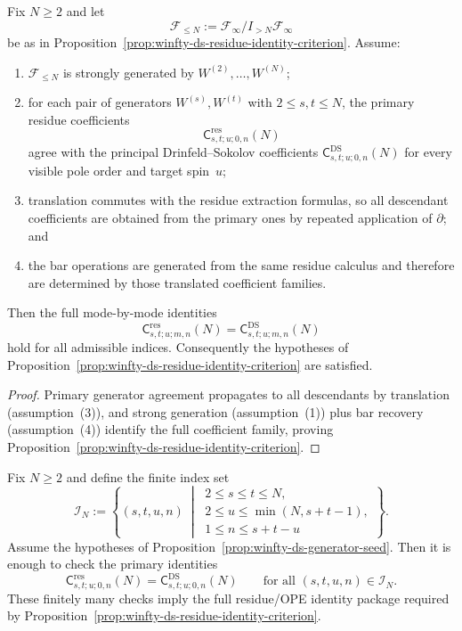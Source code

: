 \begin{proposition}
\label{prop:winfty-ds-generator-seed}
Fix $N \ge 2$ and let
\[
\mathcal{F}_{\le N}:=\mathcal{F}_\infty/I_{>N}\mathcal{F}_\infty
\]
be as in
Proposition~\ref{prop:winfty-ds-residue-identity-criterion}. Assume:
\begin{enumerate}
\item $\mathcal{F}_{\le N}$ is strongly generated by
 $W^{(2)},\dots,W^{(N)}$;
\item for each pair of generators $W^{(s)},W^{(t)}$ with
 $2 \le s,t \le N$, the primary residue coefficients
 \[
 \mathsf{C}^{\mathrm{res}}_{s,t;u;0,n}(N)
 \]
 agree with the principal Drinfeld--Sokolov coefficients
 $\mathsf{C}^{\mathrm{DS}}_{s,t;u;0,n}(N)$ for every visible pole order
 and target spin~$u$;
\item translation commutes with the residue extraction formulas, so all
 descendant coefficients are obtained from the primary ones by
 repeated application of $\partial$; and
\item the bar operations are generated from the same residue calculus
 and therefore are determined by those translated coefficient
 families.
\end{enumerate}
Then the full mode-by-mode identities
\[
\mathsf{C}^{\mathrm{res}}_{s,t;u;m,n}(N)
=\mathsf{C}^{\mathrm{DS}}_{s,t;u;m,n}(N)
\]
hold for all admissible indices. Consequently the hypotheses of
Proposition~\ref{prop:winfty-ds-residue-identity-criterion} are
satisfied.
\end{proposition}

\begin{proof}
Primary generator agreement propagates to all descendants by translation (assumption~(3)), and strong generation (assumption~(1)) plus bar recovery (assumption~(4)) identify the full coefficient family, proving Proposition~\ref{prop:winfty-ds-residue-identity-criterion}.
\end{proof}

\begin{corollary}
\label{cor:winfty-ds-finite-seed-set}
Fix $N \ge 2$ and define the finite index set
\[
\mathcal{I}_N:=
\left\{
(s,t,u,n)\ \middle|\
\begin{array}{l}
2 \le s \le t \le N,\\
2 \le u \le \min(N,s+t-1),\\
1 \le n \le s+t-u
\end{array}
\right\}.
\]
Assume the hypotheses of
Proposition~\ref{prop:winfty-ds-generator-seed}. Then it is enough to
check the primary identities
\[
\mathsf{C}^{\mathrm{res}}_{s,t;u;0,n}(N)
=\mathsf{C}^{\mathrm{DS}}_{s,t;u;0,n}(N)
\qquad\text{for all } (s,t,u,n)\in\mathcal{I}_N.
\]
These finitely many checks imply the full residue/OPE identity package
required by
Proposition~\ref{prop:winfty-ds-residue-identity-criterion}.
\end{corollary}

